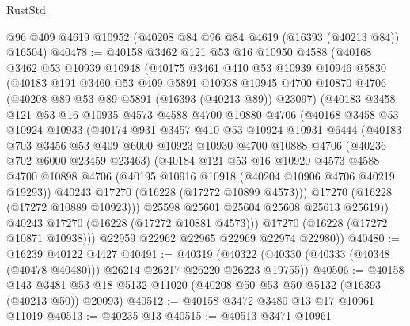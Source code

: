 \begin{lexlean}{RustStd}
\begin{coremodule}
    @96
    @409
    @4619
    @10952
    (@40208 @84 @96 @84 @4619 (@16393 (@40213 @84)) @16504)
@40478 := @40158
    @3462
    @121
    @53
    @16
    @10950
    @4588
    (@40168
      @3462
      @53
      @10939
      @10948
      (@40175
        @3461
        @410
        @53
        @10939
        @10946
        @5830
        (@40183
          @191
          @3460
          @53
          @409
          @5891
          @10938
          @10945
          @4700
          @10870
          @4706
          (@40208 @89 @53 @89 @5891 (@16393 (@40213 @89)) @23097)
          (@40183
            @3458
            @121
            @53
            @16
            @10935
            @4573
            @4588
            @4700
            @10880
            @4706
            (@40168
              @3458
              @53
              @10924
              @10933
              (@40174
                @931
                @3457
                @410
                @53
                @10924
                @10931
                @6444
                (@40183
                  @703
                  @3456
                  @53
                  @409
                  @6000
                  @10923
                  @10930
                  @4700
                  @10888
                  @4706
                  (@40236 @702 @6000 @23459 @23463)
                  (@40184
                    @121
                    @53
                    @16
                    @10920
                    @4573
                    @4588
                    @4700
                    @10898
                    @4706
                    (@40195 @10916 @10918 (@40204 @10906 @4706 @40219 @19293))
                    @40243
                    @17270
                    (@16228 (@17272 @10899 @4573)))
                  @17270
                  (@16228 (@17272 @10889 @10923)))
                @25598
                @25601
                @25604
                @25608
                @25613
                @25619))
            @40243
            @17270
            (@16228 (@17272 @10881 @4573)))
          @17270
          (@16228 (@17272 @10871 @10938)))
        @22959
        @22962
        @22965
        @22969
        @22974
        @22980))
@40480 := @16239 @40122 @4427
@40491 := @40319
    (@40322 (@40330 (@40333 (@40348 (@40478 @40480))) @26214 @26217 @26220 @26223 @19755))
@40506 := @40158
    @143
    @3481
    @53
    @18
    @5132
    @11020
    (@40208 @50 @53 @50 @5132 (@16393 (@40213 @50)) @20093)
@40512 := @40158 @3472 @3480 @13 @17 @10961 @11019
@40513 := @40235 @13
@40515 := @40513 @3471 @10961

\end{coremodule}
\end{lexlean}
